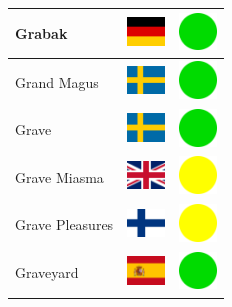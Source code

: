 \documentclass[12pt, a4paper, twoside]{report}
\begin{document}
\begin{center}
\begin{longtable}{|p{5cm}|p{2cm}|p{2cm}|}
			Grabak & \includegraphics[width=1cm]{4x3/de} & \includegraphics[width=1cm]{likes/y} \\ \hline
			Grand Magus & \includegraphics[width=1cm]{4x3/se} & \includegraphics[width=1cm]{likes/y} \\ \hline
			Grave & \includegraphics[width=1cm]{4x3/se} & \includegraphics[width=1cm]{likes/y} \\ \hline
			Grave Miasma & \includegraphics[width=1cm]{4x3/gb} & \includegraphics[width=1cm]{likes/m} \\ \hline
			Grave Pleasures & \includegraphics[width=1cm]{4x3/fi} & \includegraphics[width=1cm]{likes/m} \\ \hline
			Graveyard & \includegraphics[width=1cm]{4x3/es} & \includegraphics[width=1cm]{likes/y} \\ \hline

\end{longtable}
\end{center}
\end{document}
